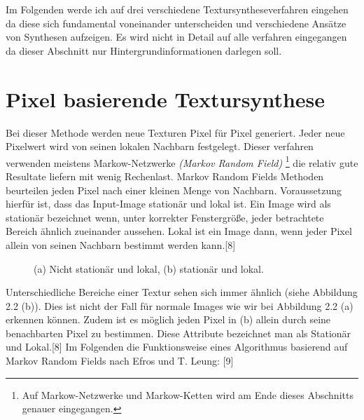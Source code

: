 \documentclass[12pt, a4paper,twoside,openright]{report}
\begin{document}
Im Folgenden werde ich auf drei verschiedene Textursyntheseverfahren eingehen da diese sich fundamental voneinander unterscheiden und verschiedene Ansätze von Synthesen aufzeigen.
Es wird nicht in Detail auf alle verfahren eingegangen da dieser Abschnitt nur Hintergrundinformationen darlegen soll.

\section{Pixel basierende Textursynthese}

Bei dieser Methode werden neue Texturen Pixel für Pixel generiert.
Jeder neue Pixelwert wird von seinen lokalen Nachbarn festgelegt.
Dieser verfahren verwenden meistens Markow-Netzwerke \textit{(Markov Random Field)}
\footnote[1]{Auf Markow-Netzwerke und Markow-Ketten wird am Ende dieses Abschnitts genauer eingegangen.}
die relativ gute Resultate liefern mit wenig Rechenlast.
Markov Random Fields Methoden beurteilen jeden Pixel nach einer kleinen Menge von Nachbarn.
Voraussetzung hierfür ist, dass das Input-Image stationär und lokal ist.
Ein Image wird als stationär bezeichnet wenn, unter korrekter Fenstergröße,
jeder betrachtete Bereich ähnlich zueinander aussehen.
Lokal ist ein Image dann, wenn jeder Pixel allein von seinen Nachbarn bestimmt werden kann.{[8]}

\begin{figure}[H]
    \centering
    \qquad
    \caption{(a) Nicht stationär und lokal, (b) stationär und lokal.}%
\end{figure}

Unterschiedliche Bereiche einer Textur sehen sich immer ähnlich {(siehe Abbildung 2.2 (b))}.
Dies ist nicht der Fall für normale Images wie wir bei Abbildung 2.2 {(a)} erkennen können.
Zudem ist es möglich jeden Pixel in {(b)} allein durch seine benachbarten Pixel zu bestimmen.
Diese Attribute bezeichnet man als Stationär und Lokal.{[8]}
Im Folgenden die Funktionsweise eines Algorithmus basierend auf Markov Random Fields nach Efros und T. Leung: {[9]}
\end{document}
